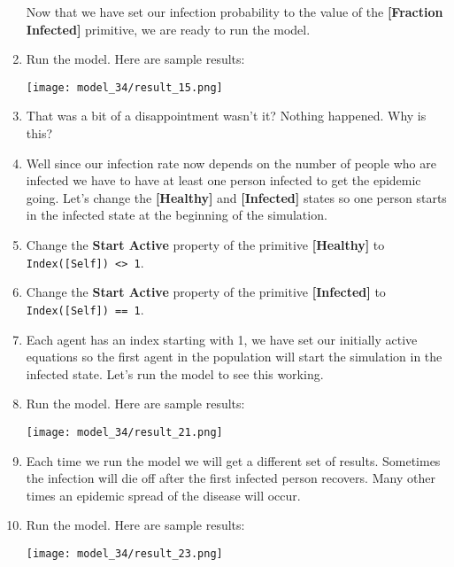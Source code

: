 \documentclass[]{memoir}
\makeatletter
\def\maxwidth{\ifdim\Gin@nat@width>\linewidth\linewidth
\else\Gin@nat@width\fi}
\let\Oldincludegraphics\includegraphics
\renewcommand{\includegraphics}[1]{\Oldincludegraphics[width=\maxwidth]{#1}}
\newcommand{\p}[1]{\textbf{{[}#1{]}}}
\newcommand{\e}[1]{\texttt{#1}}
\renewcommand{\a}[1]{\textbf{#1}}
\makeatother
\begin{document}
\begin{oframed}
\begin{enumerate}
Now that we have set our infection probability to the value of the \p{Fraction Infected} primitive, we are ready to run the model.


\item Run the model. Here are sample results:\par \begin{minipage}{\linewidth}  \centering \texttt{[image: model\_34/result\_15.png]}
\end{minipage}
\item 

That was a bit of a disappointment wasn't it? Nothing happened. Why is this?


\item 

Well since our infection rate now depends on the number of people who are infected we have to have at least one person infected to get the epidemic going. Let's change the \p{Healthy} and \p{Infected} states so one person starts in the infected state at the beginning of the simulation.


\item  Change the \a{Start Active} property of the primitive \p{Healthy} to \e{Index([Self]) <> 1}.
\item  Change the \a{Start Active} property of the primitive \p{Infected} to \e{Index([Self]) == 1}.
\item 

Each agent has an index starting with 1, we have set our initially active equations so the first agent in the population will start the simulation in the infected state. Let's run the model to see this working.


\item Run the model. Here are sample results:\par \begin{minipage}{\linewidth}  \centering \texttt{[image: model\_34/result\_21.png]}
\end{minipage}
\item 

Each time we run the model we will get a different set of results. Sometimes the infection will die off after the first infected person recovers. Many other times an epidemic spread of the disease will occur.


\item Run the model. Here are sample results:\par \begin{minipage}{\linewidth}  \centering \texttt{[image: model\_34/result\_23.png]}
\end{minipage}

\end{enumerate} \end{oframed}
\end{document}
